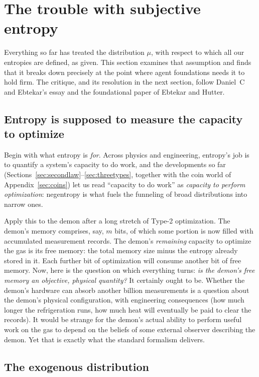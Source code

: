 \documentclass[10pt]{article}
\theoremstyle{definition}
\theoremstyle{remark}
\begin{document}
\section{The trouble with subjective entropy}
\label{sec:subjective}

Everything so far has treated the distribution $\mu$, with respect to which all our entropies are defined, as given. This section examines that assumption and finds that it breaks down precisely at the point where agent foundations needs it to hold firm. The critique, and its resolution in the next section, follow Daniel~C and Ebtekar's essay and the foundational paper of Ebtekar and Hutter.

\subsection{Entropy is supposed to measure the capacity to optimize}
\label{sec:capacity}

Begin with what entropy is \emph{for}. Across physics and engineering, entropy's job is to quantify a system's capacity to do work, and the developments so far (Sections~\ref{sec:secondlaw}--\ref{sec:threetypes}, together with the coin world of Appendix~\ref{sec:coins}) let us read ``capacity to do work'' as \emph{capacity to perform optimization}: negentropy is what fuels the funneling of broad distributions into narrow ones.

Apply this to the demon after a long stretch of Type-2 optimization. The demon's memory comprises, say, $m$ bits, of which some portion is now filled with accumulated measurement records. The demon's \emph{remaining} capacity to optimize the gas is its free memory: the total memory size minus the entropy already stored in it. Each further bit of optimization will consume another bit of free memory. Now, here is the question on which everything turns: \emph{is the demon's free memory an objective, physical quantity?} It certainly ought to be. Whether the demon's hardware can absorb another billion measurements is a question about the demon's physical configuration, with engineering consequences (how much longer the refrigeration runs, how much heat will eventually be paid to clear the records). It would be strange for the demon's actual ability to perform useful work on the gas to depend on the beliefs of some external observer describing the demon. Yet that is exactly what the standard formalism delivers.

\subsection{The exogenous distribution}
\label{sec:exogenous}
\end{document}
